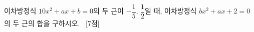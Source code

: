 이차방정식 $10x^2+ax+b=0$의 두 근이 $-\dfrac{1}{5}$, $\dfrac{1}{2}$일 때, 이차방정식 $bx^2+ax+2=0$의 두 근의 합을 구하시오. ~\mbox{\mbox{[7점]}}
